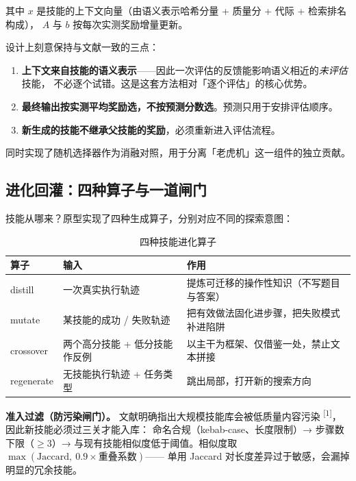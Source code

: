 \documentclass[UTF8, fontset=windows, 11pt, a4paper]{ctexart}
\begin{document}
其中 $x$ 是技能的上下文向量（由语义表示哈希分量 + 质量分 + 代际 + 检索排名构成），
$A$ 与 $b$ 按每次实测奖励增量更新。

设计上刻意保持与文献一致的三点：

\begin{enumerate}
\item \textbf{上下文来自技能的语义表示}——因此一次评估的反馈能影响语义相近的\emph{未评估}技能，
      不必逐个试错。这是这套方法相对「逐个评估」的核心优势。
\item \textbf{最终输出按实测平均奖励选，不按预测分数选}。预测只用于安排评估顺序。
\item \textbf{新生成的技能不继承父技能的奖励}，必须重新进入评估流程。
\end{enumerate}

同时实现了随机选择器作为消融对照，用于分离「老虎机」这一组件的独立贡献。

\subsection{进化回灌：四种算子与一道闸门}

技能从哪来？原型实现了四种生成算子，分别对应不同的探索意图：

\begin{table}[h]
\centering
\small
\begin{tabularx}{\textwidth}{@{}>{\ttfamily}l >{\raggedright\arraybackslash}p{4.2cm} >{\raggedright\arraybackslash}X@{}}
\toprule
\textbf{算子} & \textbf{输入} & \textbf{作用} \\
\midrule
distill & 一次真实执行轨迹 & 提炼可迁移的操作性知识（不写题目与答案） \\
mutate & 某技能的成功 / 失败轨迹 & 把有效做法固化进步骤，把失败模式补进陷阱 \\
crossover & 两个高分技能 + 低分技能作反例 & 以主干为框架、仅借鉴一处，禁止文本拼接 \\
regenerate & 无技能执行轨迹 + 任务类型 & 跳出局部，打开新的搜索方向 \\
\bottomrule
\end{tabularx}
\caption{四种技能进化算子}
\end{table}

\textbf{准入过滤（防污染闸门）。} 文献明确指出大规模技能库会被低质量内容污染
\textsuperscript{[1]}，因此新技能必须过三关才能入库：
命名合规（kebab-case、长度限制）→ 步骤数下限（$\geq 3$）→
与现有技能相似度低于阈值。相似度取 $\max(\text{Jaccard},\ 0.9 \times \text{重叠系数})$——
单用 Jaccard 对长度差异过于敏感，会漏掉明显的冗余技能。
\end{document}
